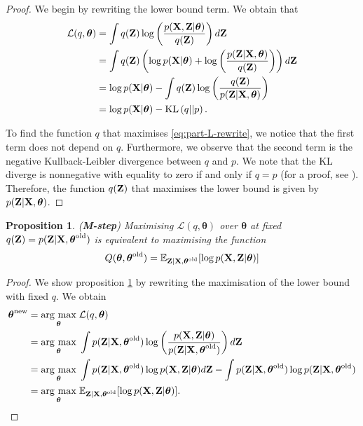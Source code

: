 \documentclass[11pt]{article}
\numberwithin{equation}{section}
\newcommand{\argmax}[1]{\underset{#1}{\operatorname{arg}\,\operatorname{max}}\;}
\newcommand{\KL}[2]{\text{KL}\left(#1 \vert\vert #2\right)}
\newcommand{\X}{{\bf X}}
\newcommand{\Z}{{\bf Z}}
\newtheorem{proposition}{Proposition}[section]
\begin{document}
\begin{proof}
	We begin by rewriting the lower bound term. We obtain that
	\begin{align}
		\mathcal{L}(q, \boldsymbol\theta) &= \int q(\Z)\log\left(\frac{p(\X, \Z \vert \boldsymbol\theta)}{q(\Z)}\right) d{\bf Z}\\
		&= \int q(\Z) \left(\log p(\X\vert\boldsymbol\theta) + \log\left( \frac{p(\Z \vert \X, \boldsymbol\theta)}{q(\Z)} \right) \right) d\Z\\
		&= \log p(\X \vert \boldsymbol{\theta}) - \int q(\Z) \log\left(\frac{q(\Z)}{p(\Z \vert \X, \boldsymbol\theta)}\right)\\
		&= \log p(\X \vert \boldsymbol\theta) - \KL{q}{p}. \label{eq:part-L-rewrite}
	\end{align}
	
	To find the function $q$ that maximises \eqref{eq:part-L-rewrite}, we notice that the first term does not depend on $q$. Furthermore, we observe that the second term is the negative Kullback-Leibler divergence between $q$ and $p$. We note that the KL diverge is nonnegative with equality to zero if and only if $q=p$   (for a proof, see \cite{murphy2012}). Therefore, the function $q(\Z)$ that maximises the lower bound is given by $p(\Z \vert \X, \boldsymbol\theta)$.
\end{proof}

\begin{proposition}\label{prop:m-step}
	(\textbf{M-step}) Maximising $\mathcal{L}(q, \boldsymbol{\theta})$ over $\boldsymbol{\theta}$ at fixed $q({\bf Z}) = p({\bf Z} \vert {\bf X}, \boldsymbol\theta^\text{old})$ is equivalent to maximising the function
	\begin{equation}
		Q(\boldsymbol{\theta}, \boldsymbol{\theta}^\text{old}) = \mathbb{E}_{{\bf Z}\vert {\bf X}, \boldsymbol{\theta}^\text{old}}[\log p({\bf X}, {\bf Z}\vert \boldsymbol\theta)]
	\end{equation}
\end{proposition}

\begin{proof}
	We show proposition \ref{prop:m-step} by rewriting the maximisation of the lower bound with fixed $q$. We obtain
	\begin{align}
		\boldsymbol{\theta}^\text{new} &= \argmax{\boldsymbol\theta} \mathcal{L}(q, \boldsymbol\theta)\\
		&= \argmax{\boldsymbol{\theta}} \int p(\Z \vert \X, \boldsymbol{\theta}^\text{old}) \log\left(\frac{p(\X, \Z \vert \boldsymbol\theta)}{p(\Z \vert \X, \boldsymbol\theta^\text{old})}\right) d\Z\\
		&= \argmax{\boldsymbol{\theta}} \int p(\Z \vert \X, \boldsymbol{\theta} ^\text{old}) \log p(\X, \Z \vert \boldsymbol\theta) d\Z - \int p(\Z \vert \X, \boldsymbol{\theta}^\text{old}) \log p(\Z \vert \X, \boldsymbol{\theta}^\text{old})\\
		&= \argmax{\boldsymbol{\theta}} \mathbb{E}_{{\bf Z}\vert {\bf X}, \boldsymbol{\theta}^\text{old}}[\log p({\bf X}, {\bf Z}\vert \boldsymbol\theta)].
	\end{align}
\end{proof}
\end{document}
